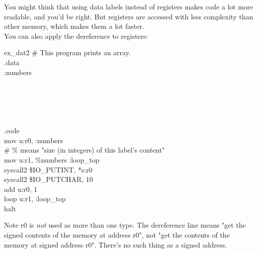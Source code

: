 \documentclass[a4paper,oneside,openany]{book}
\begin{document}
You might think that using data labels instead of registers makes code a lot more readable, and you'd be right. But registers are accessed with less complexity than other memory, which makes them a lot faster.\\
You can also apply the dereference to registers:
\begin{codefile}{ex\_dat2}
\# This program prints an array.\\
.data\\
:numbers\\
\\
\\
\\
\\
\\
.code\\
\>	mov u:r0, :numbers\\
\>\# \% means "size (in integers) of this label's content"\\
\>	mov u:r1, \%numbers
:loop\_top\\
\>	syscall2 \$IO\_PUTINT, *s:r0\\
\>	syscall2 \$IO\_PUTCHAR, 10\\
\>	add u:r0, 1\\
\>	loop u:r1, :loop\_top\\
\>	halt
\end{codefile}
Note r0 is \emph{not} used as more than one type. The dereference line means
"get the signed contents of the memory at address r0", not "get the contents
of the memory at signed address r0". There's no such thing as a signed address.
\end{document}
